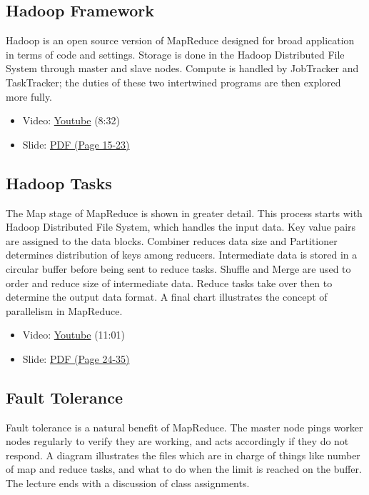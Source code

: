 \subsection{Hadoop Framework}\label{hadoop-framework}

Hadoop is an open source version of MapReduce designed for broad
application in terms of code and settings. Storage is done in the Hadoop
Distributed File System through master and slave nodes. Compute is
handled by JobTracker and TaskTracker; the duties of these two
intertwined programs are then explored more fully.

\begin{itemize}
\tightlist
\item
  Video: \href{https://www.youtube.com/watch?v=Vuroqly6FTE}{Youtube}
  (8:32)
\item
  Slide:
  \href{https://drive.google.com/open?id=0B88HKpainTSfMnpCelpNQUpNdVE}{PDF
  (Page 15-23)}
\end{itemize}

\subsection{Hadoop Tasks}\label{hadoop-tasks}

The Map stage of MapReduce is shown in greater detail. This process
starts with Hadoop Distributed File System, which handles the input
data. Key value pairs are assigned to the data blocks. Combiner reduces
data size and Partitioner determines distribution of keys among
reducers. Intermediate data is stored in a circular buffer before being
sent to reduce tasks. Shuffle and Merge are used to order and reduce
size of intermediate data. Reduce tasks take over then to determine the
output data format. A final chart illustrates the concept of parallelism
in MapReduce.

\begin{itemize}
\tightlist
\item
  Video: \href{https://www.youtube.com/watch?v=UN4t3tvdjms}{Youtube}
  (11:01)
\item
  Slide:
  \href{https://drive.google.com/open?id=0B88HKpainTSfMnpCelpNQUpNdVE}{PDF
  (Page 24-35)}
\end{itemize}

\subsection{Fault Tolerance}\label{fault-tolerance}

Fault tolerance is a natural benefit of MapReduce. The master node pings
worker nodes regularly to verify they are working, and acts accordingly
if they do not respond. A diagram illustrates the files which are in
charge of things like number of map and reduce tasks, and what to do
when the limit is reached on the buffer. The lecture ends with a
discussion of class assignments.

